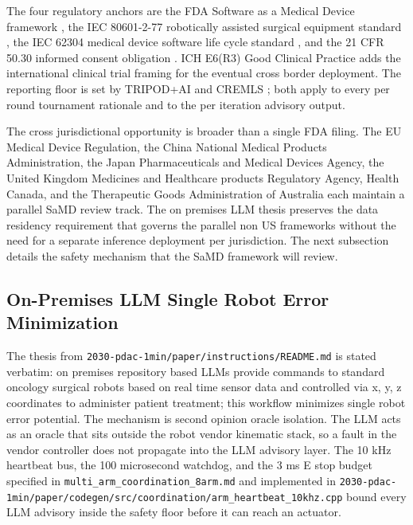 The four regulatory anchors are the FDA Software as a Medical
Device framework \cite{fda-samd}, the IEC 80601-2-77 robotically
assisted surgical equipment standard \cite{iec-80601-2-77}, the
IEC 62304 medical device software life cycle standard
\cite{iec-62304}, and the 21 CFR 50.30 informed consent obligation
\cite{cfr-21-50-30}. ICH E6(R3) Good Clinical Practice
\cite{ich-e6r3} adds the international clinical trial framing for
the eventual cross border deployment. The reporting floor is set
by TRIPOD+AI \cite{Collins2024TRIPODAI} and CREMLS
\cite{ElEmam2024CREMLS}; both apply to every per round tournament
rationale and to the per iteration advisory output.

The cross jurisdictional opportunity is broader than a single FDA
filing. The EU Medical Device Regulation, the China National
Medical Products Administration, the Japan Pharmaceuticals and
Medical Devices Agency, the United Kingdom Medicines and Healthcare
products Regulatory Agency, Health Canada, and the Therapeutic
Goods Administration of Australia each maintain a parallel SaMD
review track. The on premises LLM thesis preserves the data
residency requirement that governs the parallel non US frameworks
without the need for a separate inference deployment per
jurisdiction. The next subsection details the safety mechanism
that the SaMD framework will review.

\subsection{On-Premises LLM Single Robot Error Minimization}
\label{sec:discussion-onprem}

The thesis from
\texttt{2030-pdac-1min/paper/instructions/README.md} is stated
verbatim: on premises repository based LLMs provide commands to
standard oncology surgical robots based on real time sensor data
and controlled via x, y, z coordinates to administer patient
treatment; this workflow minimizes single robot error potential.
The mechanism is second opinion oracle isolation. The LLM acts as
an oracle that sits outside the robot vendor kinematic stack, so a
fault in the vendor controller does not propagate into the LLM
advisory layer. The 10 kHz heartbeat bus, the 100 microsecond
watchdog, and the 3 ms E stop budget specified in
\texttt{multi_arm_coordination_8arm.md} and implemented in
\texttt{2030-pdac-1min/paper/codegen/src/coordination/arm_heartbeat_10khz.cpp}
bound every LLM advisory inside the safety floor before it can
reach an actuator.

